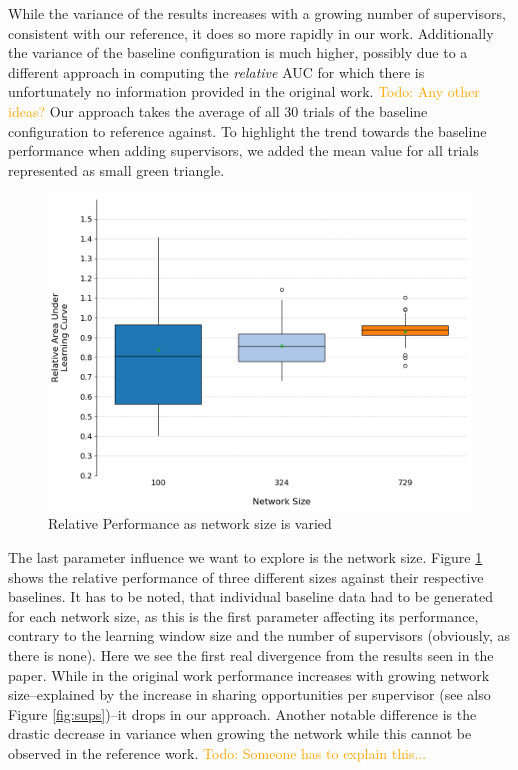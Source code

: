 \documentclass[letterpaper]{article}
\newcommand\todo[1]{\textcolor{orange}{Todo: #1}}
\begin{document}
While the variance of the results increases with a growing number of supervisors, consistent with our reference, it does so more rapidly in our work. Additionally the variance of the baseline configuration is much higher, possibly due to a different approach in computing the \textit{relative} AUC for which there is unfortunately no information provided in the original work. \todo{Any other ideas?} Our approach takes the average of all 30 trials of the baseline configuration to reference against. To highlight the trend towards the baseline performance when adding supervisors, we added the mean value for all trials represented as small green triangle.
\begin{figure}[H]
 \begin{center}
  \includegraphics[width=\linewidth]{figures/figure8}
  \caption{Relative Performance as network size is varied}
  \label{fig:sizes}
 \end{center}
\end{figure}

The last parameter influence we want to explore is the network size. Figure \ref{fig:sizes} shows the relative performance of three different sizes against their respective baselines. It has to be noted, that individual baseline data had to be generated for each network size, as this is the first parameter affecting its performance, contrary to the learning window size and the number of supervisors (obviously, as there is none). Here we see the first real divergence from the results seen in the paper. While in the original work performance increases with growing network size--explained by the increase in sharing opportunities per supervisor (see also Figure \ref{fig:sups})--it drops in our approach. Another notable difference is the drastic decrease in variance when growing the network while this cannot be observed in the reference work. \todo{Someone has to explain this...}
\end{document}
